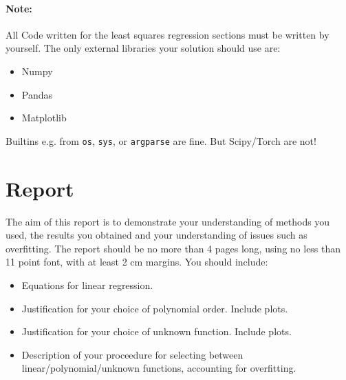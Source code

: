 \documentclass[12pt]{article}
\begin{document}
\paragraph{Note:} All Code written for the least squares regression sections must be written by yourself.
The only external libraries your solution should use are:
\begin{itemize}
  \item Numpy
  \item Pandas
  \item Matplotlib
\end{itemize}
Builtins e.g. from \texttt{os}, \texttt{sys}, or \texttt{argparse} are fine.  But Scipy/Torch are not!

\section{Report}

The aim of this report is to demonstrate your understanding of methods you used, the results you obtained and your understanding of issues such as overfitting.
The report should be no more than 4 pages long, using no less than 11 point font, with at least 2 cm margins.
You should include:
\begin{itemize}
  \item Equations for linear regression.
  \item Justification for your choice of polynomial order.  Include plots.
  \item Justification for your choice of unknown function.  Include plots.
  \item Description of your proceedure for selecting between linear/polynomial/unknown functions, accounting for overfitting.
\end{itemize}
\end{document}
